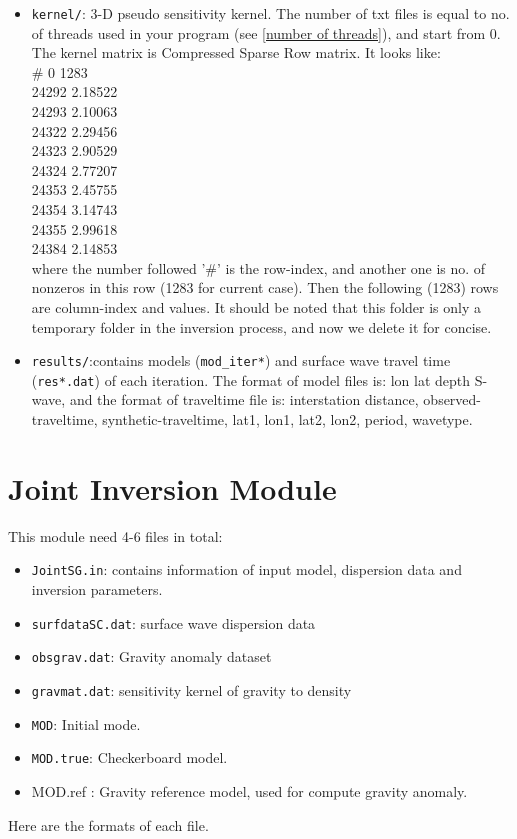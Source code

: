 \documentclass[UTF8]{article}
\begin{document}
    \begin{itemize}
    \item \verb!kernel/!: 3-D pseudo sensitivity kernel. The number of txt files is 
    equal to no. of threads used in your program (see \ref{number of threads}), and start from 0.
    The kernel matrix is Compressed Sparse Row matrix. It looks like:\\
    \# 0 1283\\
    24292 2.18522\\
    24293 2.10063\\
    24322 2.29456\\
    24323 2.90529\\
    24324 2.77207\\
    24353 2.45755\\
    24354 3.14743\\
    24355 2.99618\\
    24384 2.14853\\
    where the number followed '\#' is the row-index, and another one is no. of nonzeros
    in this row (1283 for current case). Then the following (1283) rows
    are column-index and values. It should be noted that this folder is only a temporary folder 
    in the inversion process, and now we delete it for concise.

    \item \verb!results/!:contains models (\verb!mod_iter*!)
                        and surface wave travel time (\verb!res*.dat!) of each iteration. The format 
                        of model files is: lon lat depth S-wave, and the format of 
                        traveltime file is: interstation distance, observed-traveltime,
                        synthetic-traveltime, lat1, lon1, lat2, lon2, period, wavetype.
    \end{itemize}

    \section{Joint Inversion Module}
    This module need 4-6 files in total:
    \begin{itemize}
        \item \verb!JointSG.in!: contains information of input model, dispersion data and inversion parameters.
        \item \verb!surfdataSC.dat!: surface wave dispersion data
        \item \verb!obsgrav.dat!: Gravity anomaly dataset
        \item \verb!gravmat.dat!: sensitivity kernel of gravity to density
        \item \verb!MOD!: Initial mode.
        \item \verb!MOD.true!: Checkerboard model.
        \item MOD.ref : Gravity reference model, used for compute gravity anomaly.
    \end{itemize}
    Here are the formats of each file.
\end{document}

